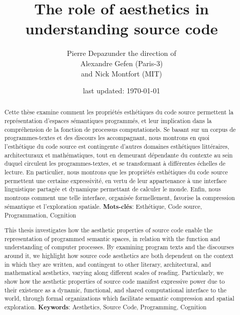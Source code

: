 \documentclass{report}
\begin{document}
\title{The role of aesthetics in understanding source code}
\author{Pierre Depaz\linebreak\linebreak under the direction of\\Alexandre Gefen (Paris-3)\\and Nick Montfort (MIT)}
\date{last updated: \today}
\maketitle

\renewcommand{\abstractname}{Résumé}
\begin{abstract}
    Cette thèse examine comment les propriétés esthétiques du code source permettent la représentation d'espaces sémantiques programmés, et leur implication dans la compréhension de la fonction de processus computationels. Se basant sur un corpus de programmes-textes et des discours les accompagnant, nous montrons en quoi l'esthétique du code source est contingente d'autres domaines esthétiques littéraires, architecturaux et mathématiques, tout en demeurant dépendante du contexte au sein duquel circulent les programmes-textes, et se transformant à différentes échelles de lecture. En particulier, nous montrons que les propriétés esthétiques du code source permettent une certaine expressivité, en vertu de leur appartenance à une interface linguistique partagée et dynamique permettant de calculer le monde. Enfin, nous montrons comment une telle interface, organisée formellement, favorise la compression sémantique et l'exploration spatiale.
    \linebreak
    \linebreak
    \textbf{Mots-clés}: Esthétique, Code source, Programmation, Cognition
\end{abstract}

\renewcommand{\abstractname}{Summary}
\begin{abstract}
    This thesis investigates how the aesthetic properties of source code enable the representation of programmed semantic spaces, in relation with the function and understanding of computer processes. By examining program texts and the discourses around it, we highlight how source code aesthetics are both dependent on the context in which they are written, and contingent to other literary, architectural, and mathematical aesthetics, varying along different scales of reading. Particularly, we show how the aesthetic properties of source code manifest expressive power due to their existence as a dynamic, functional, and shared computational interface to the world, through formal organizations which facilitate semantic compression and spatial exploration.
    \linebreak
    \linebreak
    \textbf{Keywords}: Aesthetics, Source Code, Programming, Cognition
\end{abstract}
\end{document}
